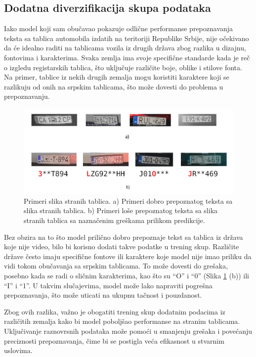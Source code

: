 \documentclass[a4paper,12pt]{article}
\begin{document}
	\subsection{Dodatna diverzifikacija skupa podataka}
	Iako model koji sam obučavao pokazuje odlične performanse prepoznavanja teksta sa tablica automobila izdatih na teritoriji Republike Srbije, nije očekivano da će idealno raditi na tablicama vozila iz drugih država zbog razlika u dizajnu, fontovima i karakterima. Svaka zemlja ima svoje specifične standarde kada je reč o izgledu registarskih tablica, što uključuje različite boje, oblike i stilove fonta. Na primer, tablice iz nekih drugih zemalja mogu koristiti karaktere koji se razlikuju od onih na srpskim tablicama, što može dovesti do problema u prepoznavanju.
	
	\begin{figure}[H]
		\centering
		\includegraphics[width=\textwidth]{assets/good-and-bad-predictions.png}
		\caption{Primeri slika stranih tablica. a) Primeri dobro prepoznatog teksta sa slika stranih tablica. b) Primeri loše prepoznatog teksta sa slika stranih tablica sa naznačenim greškama prilikom predikcije.}
		\label{fig:good-and-bad-predictions}
	\end{figure}
	
	Bez obzira na to što model prilično dobro prepoznaje tekst sa tablica iz država koje nije video, bilo bi korisno dodati takve podatke u trening skup. Različite države često imaju specifične fontove ili karaktere koje model nije imao priliku da vidi tokom obučavanja sa srpskim tablicama. To može dovesti do grešaka, posebno kada se radi o sličnim karakterima, kao što su \enquote{O} i \enquote{0} (Slika \ref{fig:good-and-bad-predictions} (b)) ili \enquote{I} i \enquote{1}. U takvim slučajevima, model može lako napraviti pogrešna prepoznavanja, što može uticati na ukupnu tačnost i pouzdanost.
	
	Zbog ovih razlika, važno je obogatiti trening skup dodatnim podacima iz različitih zemalja kako bi model poboljšao performanse na stranim tablicama. Uključivanje raznovrsnih podataka može pomoći u smanjenju grešaka i povećanju preciznosti prepoznavanja, čime bi se postigla veća efikasnost u stvarnim uslovima.
	
\end{document}
